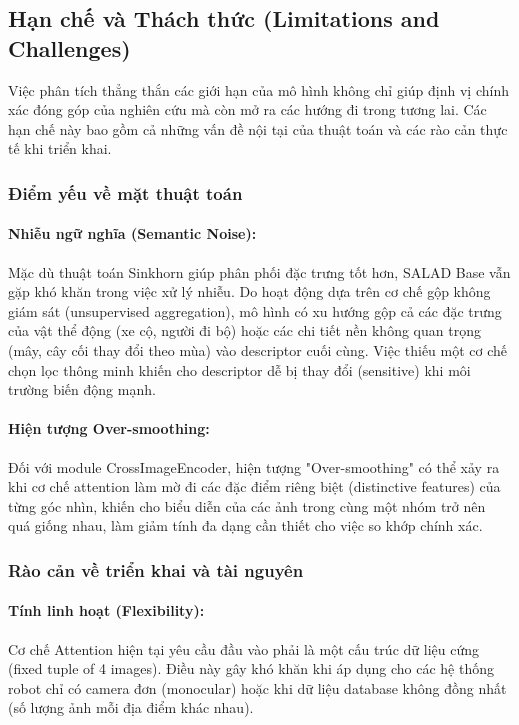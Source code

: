 \documentclass[12pt,a4paper]{article}
\begin{document}
    \subsection{Hạn chế và Thách thức (Limitations and Challenges)}

    Việc phân tích thẳng thắn các giới hạn của mô hình không chỉ giúp định vị chính xác đóng góp của nghiên cứu mà còn mở ra các hướng đi trong tương lai. Các hạn chế này bao gồm cả những vấn đề nội tại của thuật toán và các rào cản thực tế khi triển khai.

    \subsubsection{Điểm yếu về mặt thuật toán}
    
    \paragraph{Nhiễu ngữ nghĩa (Semantic Noise):}
    Mặc dù thuật toán Sinkhorn giúp phân phối đặc trưng tốt hơn, SALAD Base vẫn gặp khó khăn trong việc xử lý nhiễu. Do hoạt động dựa trên cơ chế gộp không giám sát (unsupervised aggregation), mô hình có xu hướng gộp cả các đặc trưng của vật thể động (xe cộ, người đi bộ) hoặc các chi tiết nền không quan trọng (mây, cây cối thay đổi theo mùa) vào descriptor cuối cùng. Việc thiếu một cơ chế chọn lọc thông minh khiến cho descriptor dễ bị thay đổi (sensitive) khi môi trường biến động mạnh.

    \paragraph{Hiện tượng Over-smoothing:}
    Đối với module CrossImageEncoder, hiện tượng "Over-smoothing" có thể xảy ra khi cơ chế attention làm mờ đi các đặc điểm riêng biệt (distinctive features) của từng góc nhìn, khiến cho biểu diễn của các ảnh trong cùng một nhóm trở nên quá giống nhau, làm giảm tính đa dạng cần thiết cho việc so khớp chính xác.

    \subsubsection{Rào cản về triển khai và tài nguyên}

    \paragraph{Tính linh hoạt (Flexibility):}
    Cơ chế Attention hiện tại yêu cầu đầu vào phải là một cấu trúc dữ liệu cứng (fixed tuple of 4 images). Điều này gây khó khăn khi áp dụng cho các hệ thống robot chỉ có camera đơn (monocular) hoặc khi dữ liệu database không đồng nhất (số lượng ảnh mỗi địa điểm khác nhau).
\end{document}
